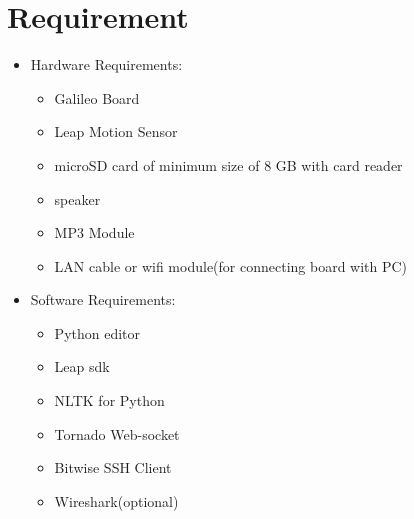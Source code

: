 \documentclass[11pt,a4paper]{article}
\begin{document}
	\section{Requirement}
	\vspace{1cm}
	\begin{itemize}
	    \item Hardware Requirements:
	    \begin{itemize}
	        \item Galileo Board
	        \item Leap Motion Sensor
	        \item microSD card of minimum size of 8 GB with card reader
	        \item speaker
	        \item MP3 Module
	        \item LAN cable or wifi module(for connecting board with PC)
	    \end{itemize}
	    \vspace{1cm}
	    \item Software Requirements:
	    \begin{itemize}
	        \item Python editor
	        \item Leap sdk
	        \item NLTK for Python
	        \item Tornado Web-socket
	        \item Bitwise SSH Client
	        \item Wireshark(optional)
	    \end{itemize}
	\end{itemize}
	\newpage
\end{document}
